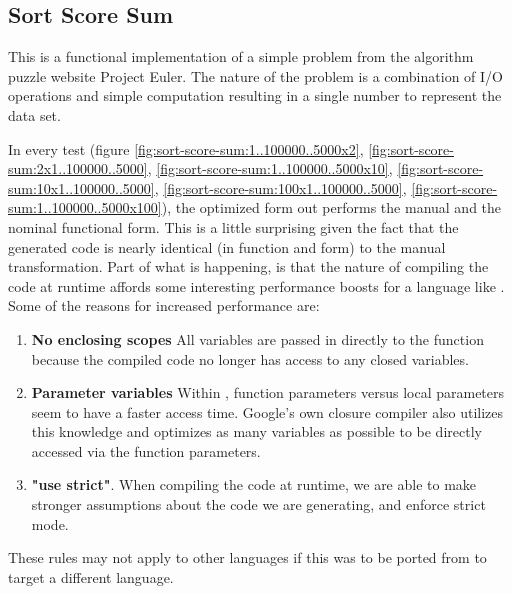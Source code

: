 \subsection{Sort Score Sum}
This is a functional implementation of a simple problem from the algorithm puzzle website Project Euler.  The nature of the problem is a combination of I/O operations and simple computation resulting in a single number to represent the data set. \cite{euler05}

In every test (figure \ref{fig:sort-score-sum:1..100000..5000x2}, \ref{fig:sort-score-sum:2x1..100000..5000}, \ref{fig:sort-score-sum:1..100000..5000x10}, \ref{fig:sort-score-sum:10x1..100000..5000}, \ref{fig:sort-score-sum:100x1..100000..5000}, \ref{fig:sort-score-sum:1..100000..5000x100}), the optimized form out performs the manual and the nominal functional form.  This is a little surprising given the fact that the generated code is nearly identical (in function and form) to the manual transformation.  Part of what is happening,  is that the nature of compiling the code at runtime affords some interesting performance boosts for a language like \javascript. Some of the reasons for increased performance are:
\begin{enumerate}
  \item \textbf{No enclosing scopes} All variables are passed in directly to the function because the compiled code no longer has access to any closed variables.
  \item \textbf{Parameter variables}  Within \veight, function parameters versus local parameters seem to have a faster access time.  Google's own closure compiler also utilizes this knowledge and optimizes as many variables as possible to be directly accessed via the function parameters. 
  \item \textbf{"use strict"}.  When compiling the code at runtime, we are able to make stronger assumptions about the code we are generating, and enforce strict mode.     
\end{enumerate}

These rules may not apply to other languages if this was to be ported from \javascript to target a different language.